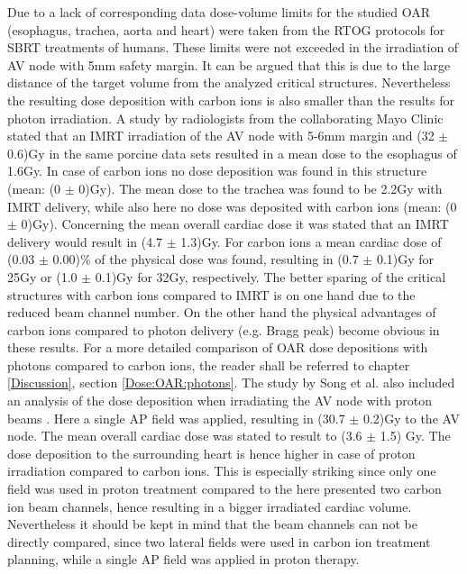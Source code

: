 Due to a lack of corresponding data dose-volume limits for the studied OAR (esophagus, trachea, aorta and heart) were taken from the RTOG 
protocols for SBRT treatments of humans. These limits were not exceeded in the irradiation of AV node with 5mm safety margin. 
It can be argued that this is due to the large distance of the target volume from the analyzed critical structures. Nevertheless the resulting 
dose deposition with carbon ions is also smaller than the results for photon irradiation. A study by radiologists from the collaborating 
Mayo Clinic \cite{Song14} stated that an IMRT irradiation of the AV node with 5-6mm margin and (32 $\pm$ 0.6)Gy in the same porcine data sets 
resulted in a mean dose to the esophagus of 1.6Gy. In case of carbon ions no dose deposition was found in this structure (mean: (0 $\pm$ 0)Gy). 
The mean dose to the trachea was found to be 2.2Gy with IMRT delivery, while also here no dose was deposited with carbon ions (mean: (0 $\pm$ 0)Gy). 
Concerning the mean overall cardiac dose it was stated that an IMRT delivery would result in (4.7 $\pm$ 1.3)Gy. For carbon ions a mean 
cardiac dose of (0.03 $\pm$ 0.00)\% of the physical dose was found, resulting in (0.7 $\pm$ 0.1)Gy for 25Gy or (1.0 $\pm$ 0.1)Gy for 32Gy, respectively. 
The better sparing of the critical structures with carbon ions compared to IMRT is on one hand due to the reduced beam channel number. 
On the other hand the physical advantages of carbon ions compared to photon delivery (e.g. Bragg peak) become obvious in these results. 
For a more detailed comparison of OAR dose depositions with photons compared to carbon ions, the reader shall be referred to chapter 
\ref{Discussion}, section \ref{Dose:OAR:photons}. 
The study by Song et al. also included an analysis of the dose deposition when irradiating the AV node with proton beams \cite{Song14}. Here a 
single AP field was applied, resulting in (30.7 $\pm$ 0.2)Gy to the AV node. The mean overall cardiac dose was stated to result to (3.6 $\pm$ 1.5) Gy. 
The dose deposition to the surrounding heart is hence higher in case of proton irradiation compared to carbon ions. This is especially striking 
since only one field was used in proton treatment compared to the here presented two carbon ion beam channels, hence resulting in a bigger 
irradiated cardiac volume. Nevertheless it should be kept in mind that the beam channels can not be directly compared, since two lateral 
fields were used in carbon ion treatment planning, while a single AP field was applied in proton therapy.\newline
